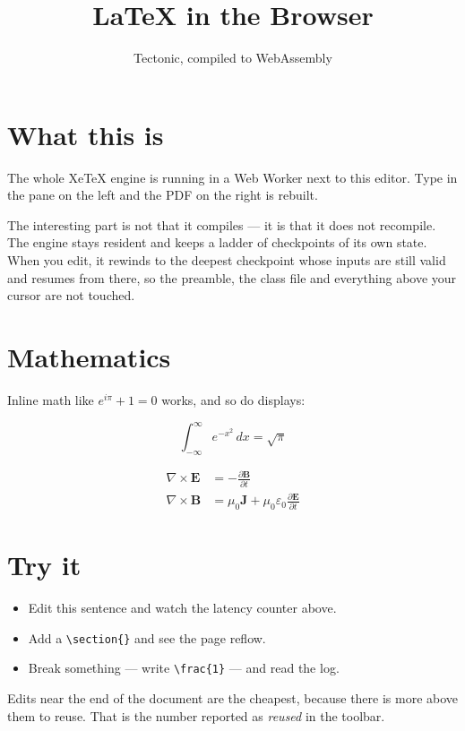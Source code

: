 \documentclass[11pt]{article}
\title{LaTeX in the Browser}
\author{Tectonic, compiled to WebAssembly}
\date{}
\begin{document}
\maketitle

\section{What this is}

The whole XeTeX engine is running in a Web Worker next to this editor.
Type in the pane on the left and the PDF on the right is rebuilt.

The interesting part is not that it compiles --- it is that it does not
recompile. The engine stays resident and keeps a ladder of checkpoints of
its own state. When you edit, it rewinds to the deepest checkpoint whose
inputs are still valid and resumes from there, so the preamble, the class
file and everything above your cursor are not touched.

\section{Mathematics}

Inline math like $e^{i\pi} + 1 = 0$ works, and so do displays:

\begin{equation}
  \int_{-\infty}^{\infty} e^{-x^{2}}\,dx = \sqrt{\pi}
\end{equation}

\begin{align}
  \nabla \times \mathbf{E} &= -\frac{\partial \mathbf{B}}{\partial t} \\
  \nabla \times \mathbf{B} &= \mu_0 \mathbf{J}
      + \mu_0 \varepsilon_0 \frac{\partial \mathbf{E}}{\partial t}
\end{align}

\section{Try it}

\begin{itemize}
  \item Edit this sentence and watch the latency counter above.
  \item Add a \verb|\section{}| and see the page reflow.
  \item Break something --- write \verb|\frac{1}| --- and read the log.
\end{itemize}

Edits near the end of the document are the cheapest, because there is more
above them to reuse. That is the number reported as \emph{reused} in the
toolbar.
\end{document}
